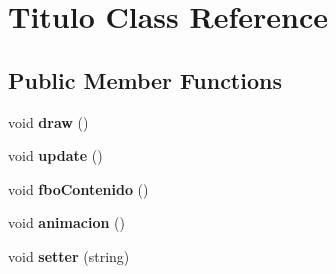 \hypertarget{class_titulo}{}\section{Titulo Class Reference}
\label{class_titulo}
\subsection*{Public Member Functions}
\begin{DoxyCompactItemize}
\item 
\hypertarget{class_titulo_ad87b7f4b7b987cf1eefb682949dca844}{}void {\bfseries draw} ()\label{class_titulo_ad87b7f4b7b987cf1eefb682949dca844}

\item 
\hypertarget{class_titulo_a3fb7e8c49b7b414b1d4bee60f7c706d1}{}void {\bfseries update} ()\label{class_titulo_a3fb7e8c49b7b414b1d4bee60f7c706d1}

\item 
\hypertarget{class_titulo_adebe0d86f62e7e809912c00007f72d5f}{}void {\bfseries fbo\+Contenido} ()\label{class_titulo_adebe0d86f62e7e809912c00007f72d5f}

\item 
\hypertarget{class_titulo_a40fcb404b1162fab2b2cb87d864e867b}{}void {\bfseries animacion} ()\label{class_titulo_a40fcb404b1162fab2b2cb87d864e867b}

\item 
\hypertarget{class_titulo_a0ac8141c8e692d06a27916c82d9e7360}{}void {\bfseries setter} (string)\label{class_titulo_a0ac8141c8e692d06a27916c82d9e7360}

\end{DoxyCompactItemize}
